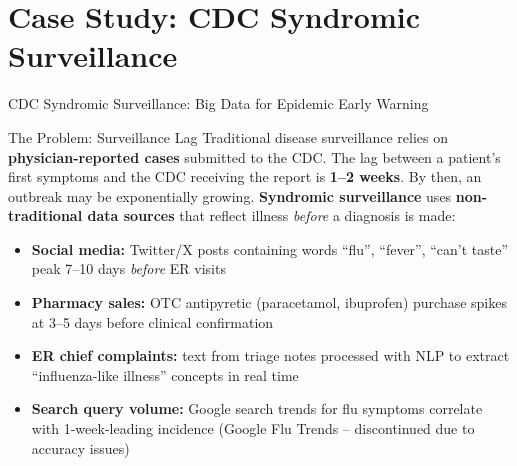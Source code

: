 \documentclass[aspectratio=169,10pt]{beamer}
\begin{document}
\section{Case Study: CDC Syndromic Surveillance}

\begin{frame}{CDC Syndromic Surveillance: Big Data for Epidemic Early Warning}
 
      \begin{block}{The Problem: Surveillance Lag}
        Traditional disease surveillance relies on \textbf{physician-reported cases} submitted to the CDC.  The lag between a patient's first symptoms and the CDC receiving the report is \textbf{1--2 weeks}.  By then, an outbreak may be exponentially growing.
        \vspace{4pt}
        \textbf{Syndromic surveillance} uses \textbf{non-traditional data sources} that reflect illness \textit{before} a diagnosis is made:
        \begin{itemize}
          \item \textbf{Social media:} Twitter/X posts containing words ``flu'', ``fever'', ``can't taste'' peak 7--10 days \textit{before} ER visits
          \item \textbf{Pharmacy sales:} OTC antipyretic (paracetamol, ibuprofen) purchase spikes at 3--5 days before clinical confirmation
          \item \textbf{ER chief complaints:} text from triage notes processed with NLP to extract ``influenza-like illness'' concepts in real time
          \item \textbf{Search query volume:} Google search trends for flu symptoms correlate with 1-week-leading incidence (Google Flu Trends -- discontinued due to accuracy issues)
        \end{itemize}
      \end{block}
 
\end{frame}
\end{document}
